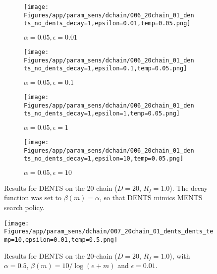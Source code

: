 \documentclass{article}
\theoremstyle{plain}
\begin{document}
\begin{appendices}
\begin{figure}
                \begin{subfigure}[b]{0.24\textwidth}
                    \centering
                    \texttt{[image: Figures/app/param\_sens/dchain/006\_20chain\_01\_dents\_no\_dents\_decay=1,epsilon=0.01,temp=0.05.png]}
                    \caption*{$\alpha=0.05,\epsilon=0.01$}
                \end{subfigure}
                \begin{subfigure}[b]{0.24\textwidth}
                    \centering
                    \texttt{[image: Figures/app/param\_sens/dchain/006\_20chain\_01\_dents\_no\_dents\_decay=1,epsilon=0.1,temp=0.05.png]}
                    \caption*{$\alpha=0.05,\epsilon=0.1$}
                \end{subfigure}
                \begin{subfigure}[b]{0.24\textwidth}
                    \centering
                    \texttt{[image: Figures/app/param\_sens/dchain/006\_20chain\_01\_dents\_no\_dents\_decay=1,epsilon=1,temp=0.05.png]}
                    \caption*{$\alpha=0.05,\epsilon=1$}
                \end{subfigure}
                \begin{subfigure}[b]{0.24\textwidth}
                    \centering
                    \texttt{[image: Figures/app/param\_sens/dchain/006\_20chain\_01\_dents\_no\_dents\_decay=1,epsilon=10,temp=0.05.png]}
                    \caption*{$\alpha=0.05,\epsilon=10$}
                \end{subfigure}
                
                \caption{Results for DENTS on the 20-chain ($D=20$, $R_f=1.0$). The decay function was set to $\beta(m)=\alpha$, so that DENTS mimics MENTS search policy.}
                \label{fig:dbments_20chain_hps}
            \end{figure}


            \begin{figure}
                \centering
                \texttt{[image: Figures/app/param\_sens/dchain/007\_20chain\_01\_dents\_dents\_temp=10,epsilon=0.01,temp=0.5.png]}
                \caption{Results for DENTS on the 20-chain ($D=20$, $R_f=1.0$), with $\alpha=0.5$, $\beta(m)=10/\log(e+m)$ and $\epsilon=0.01$.}
                \label{fig:dents_20chain_tuned}
            \end{figure}






\end{appendices}
\end{document}
